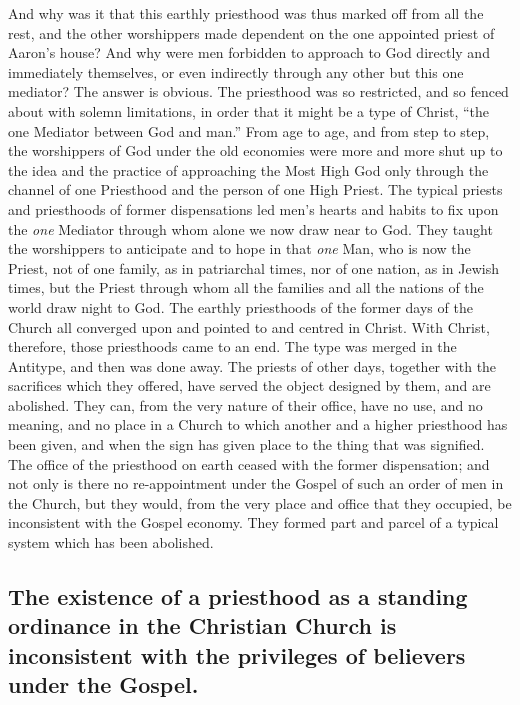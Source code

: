 \documentclass[english,]{book}
\begin{document}
And why was it that this earthly priesthood was thus marked off from all the rest, and the other worshippers made dependent on the one appointed priest of Aaron's house? And why were men forbidden to approach to God directly and immediately themselves, or even indirectly through any other but this one mediator? The answer is obvious. The priesthood was so restricted, and so fenced about with solemn limitations, in order that it might be a type of Christ, ``the one Mediator between God and man.'' From age to age, and from step to step, the worshippers of God under the old economies were more and more shut up to the idea and the practice of approaching the Most High God only through the channel of one Priesthood and the person of one High Priest. The typical priests and priesthoods of former dispensations led men's hearts and habits to fix upon the \emph{one} Mediator through whom alone we now draw near to God. They taught the worshippers to anticipate and to hope in that \emph{one} Man, who is now the Priest, not of one family, as in patriarchal times, nor of one nation, as in Jewish times, but the Priest through whom all the families and all the nations of the world draw night to God. The earthly priesthoods of the former days of the Church all converged upon and pointed to and centred in Christ. With Christ, therefore, those priesthoods came to an end. The type was merged in the Antitype, and then was done away. The priests of other days, together with the sacrifices which they offered, have served the object designed by them, and are abolished. They can, from the very nature of their office, have no use, and no meaning, and no place in a Church to which another and a higher priesthood has been given, and when the sign has given place to the thing that was signified. The office of the priesthood on earth ceased with the former dispensation; and not only is there no re-appointment under the Gospel of such an order of men in the Church, but they would, from the very place and office that they occupied, be inconsistent with the Gospel economy. They formed part and parcel of a typical system which has been abolished.

\hypertarget{the-existence-of-a-priesthood-as-a-standing-ordinance-in-the-christian-church-is-inconsistent-with-the-privileges-of-believers-under-the-gospel.}{%
\subsection{The existence of a priesthood as a standing ordinance in the Christian Church is inconsistent with the privileges of believers under the Gospel.}\label{the-existence-of-a-priesthood-as-a-standing-ordinance-in-the-christian-church-is-inconsistent-with-the-privileges-of-believers-under-the-gospel.}}
\end{document}
